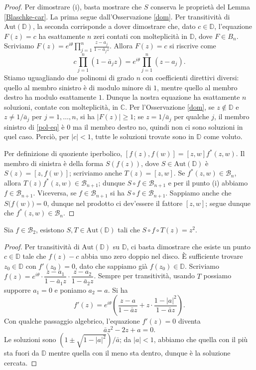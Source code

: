 \begin{proof}
  Per dimostrare (i), basta mostrare che $S$ conserva le proprietà del Lemma \ref{Blaschke-car}. La prima segue dall'Osservazione \ref{dom}. Per transitività di $\text{Aut}(\mathbb{D})$, la seconda corrisponde a dover dimostrare che, dato $c \in \mathbb{D}$, l'equazione $F(z)=c$ ha esattamente $n$ zeri contati con molteplicità in $\mathbb{D}$, dove $F \in B_n$. Scriviamo $F(z)=\displaystyle e^{i\theta}\prod_{j=1}^n \frac{z-a_j}{1-\bar{a}_jz}$. Allora $F(z)=c$ si riscrive come
  \begin{equation} \label{pol-eq}
    c\prod_{j=1}^n (1-\bar{a}_jz)=e^{i\theta}\prod_{j=1}^n(z-a_j).
  \end{equation}
  Stiamo uguagliando due polinomi di grado $n$ con coefficienti direttivi diversi: quello al membro sinistro è di modulo minore di $1$, mentre quello al membro destro ha modulo esattamente $1$. Dunque la nostra equazione ha esattamente $n$ soluzioni, contate con molteplicità, in $\mathbb{C}$.
  Per l'Osservazione \ref{dom}, se $z \not\in \mathbb{D}$ e $z\not=1/\bar{a}_j$ per $j=1,\dots,n$, si ha $|F(z)| \ge 1$; se $z=1/\bar{a}_j$ per qualche $j$, il membro sinistro di \eqref{pol-eq} è $0$ ma il membro destro no, quindi non ci sono soluzioni in quel caso. Perciò, per $|c|<1$, tutte le soluzioni trovate sono in $\mathbb{D}$ come voluto.

  Per definizione di quoziente iperbolico, $[f(z),f(w)]=[z,w]f^*(z,w)$. Il membro di sinistra è della forma $S(f(z))$, dove $S \in \text{Aut}(\mathbb{D})$ è $S(z)=[z,f(w)]$; scriviamo anche $T(z)=[z,w]$.
  Se $f^*(z,w) \in \mathcal{B}_n$, allora $T(z)f^*(z,w) \in \mathcal{B}_{n+1}$; dunque $S\circ f \in \mathcal{B}_{n+1}$ e per il punto (i) abbiamo $f \in \mathcal{B}_{n+1}$. Viceversa, se $f \in \mathcal{B}_{n+1}$ si ha $S\circ f \in \mathcal{B}_{n+1}$.
  Sappiamo anche che $S\bigl(f(w)\bigr)=0$, dunque nel prodotto ci dev'essere il fattore $[z,w]$; segue dunque che $f^*(z,w) \in \mathcal{B}_n$.
\end{proof}

\begin{lm}
  Sia $f \in \mathcal{B}_2$, esistono $S, T \in \text{Aut}(\mathbb{D})$ tali che $S\circ f\circ T(z)=z^2$.
\end{lm}

\begin{proof}
  Per transitività di $\text{Aut}(\mathbb{D})$ su $\mathbb{D}$, ci basta dimostrare che esiste un punto $c \in \mathbb{D}$ tale che $f(z)-c$ abbia uno zero doppio nel disco. È sufficiente trovare $z_0 \in \mathbb{D}$ con $f'(z_0)=0$, dato che sappiamo già $f(z_0) \in \mathbb{D}$. Scriviamo $f(z)=e^{i\theta}\cdot\dfrac{z-a_1}{1-\bar{a}_1z}\cdot\dfrac{z-a_2}{1-\bar{a}_2z}$.
  Sempre per transitività, usando $T$ possiamo supporre $a_1=0$ e poniamo $a_2=a$. Si ha
  $$f'(z)=e^{i\theta}\left(\frac{z-a}{1-\bar{a}z}+z\cdot\frac{1-|a|^2}{1-\bar{a}z}\right).$$
  Con qualche passaggio algebrico, l'equazione $f'(z)=0$ diventa
  $$\bar{a}z^2-2z+a=0.$$
  Le soluzioni sono $(1 \pm \sqrt{1-|a|^2})/\bar{a}$; da $|a|<1$, abbiamo che quella con il più sta fuori da $\mathbb{D}$ mentre quella con il meno sta dentro, dunque è la soluzione cercata.
\end{proof}

